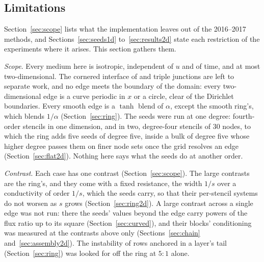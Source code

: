 \documentclass[11pt]{amsart}
\theoremstyle{definition}
\theoremstyle{remark}
\newcommand{\para}[1]{\par\smallskip\noindent\textit{#1}.\enspace}
\begin{document}
\subsection{Limitations}
\label{sec:limitations}
Section~\ref{sec:scope} lists what the implementation leaves out of the
2016--2017 methods, and Sections~\ref{sec:seeds1d} to~\ref{sec:results2d}
state each restriction of the experiments where it arises. This section
gathers them.

\para{Scope}
Every medium here is isotropic, independent of $u$ and of time, and at most
two-dimensional. The cornered interface of \cite[Sec.~5.4.5]{Martin2016}
and triple junctions are left to separate work, and no edge meets the
boundary of the domain: every two-dimensional edge is a curve periodic in
$x$ or a circle, clear of the Dirichlet boundaries. Every smooth edge is a
$\tanh$ blend of $\alpha$, except the smooth ring's, which blends
$1/\alpha$ (Section~\ref{sec:ring}). The seeds were run at one degree:
fourth-order stencils in one dimension, and in two, degree-four stencils of
$30$ nodes, to which the ring adds five seeds of degree five, inside a bulk
of degree five whose higher degree passes them on finer node sets once the
grid resolves an edge (Section~\ref{sec:flat2d}). Nothing here says what
the seeds do at another order.

\para{Contrast}
Each case has one contrast (Section~\ref{sec:scope}). The large contrasts
are the ring's, and they come with a fixed resistance, the width $1/s$
over a conductivity of order $1/s$, which the seeds carry, so that their per-stencil systems do not worsen as $s$
grows (Section~\ref{sec:ring2d}). A large contrast across a single edge was
not run: there the seeds' values beyond the edge carry powers of the flux
ratio up to its square (Section~\ref{sec:curved}), and their blocks'
conditioning was measured at the contrasts above only
(Sections~\ref{sec:chain} and~\ref{sec:assembly2d}). The instability of
rows anchored in a layer's tail (Section~\ref{sec:ring}) was looked for off
the ring at $5 : 1$ alone.
\end{document}
